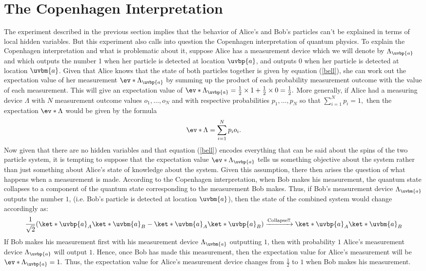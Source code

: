 \section{The Copenhagen Interpretation}
       The experiment described in the previous section implies that the behavior of Alice's and Bob's particles can't be explained in terms of local hidden variables. But this experiment also calls into question the Copenhagen interpretation of quantum physics. To explain the Copenhagen interpretation and what is problematic about it, suppose Alice has a measurement device which we will denote by $\Lambda_{\uvbp{a}}$\label{Lambdaa} and which outputs the number 1 when her particle is detected at location $\uvbp{a}$, and outputs 0 when her particle is detected at location $\uvbm{a}$. Given that Alice knows that the state of both particles together is given by equation (\ref{bell}), she can work out the expectation value of her measurement $\ev*{\Lambda_{\uvbp{a}}}$ by summing up the product of each probability measurement outcome with the value of each measurement. This will give an expectation value of $\ev*{\Lambda_{\uvbp{a}}}=\frac{1}{2}\times 1 + \frac{1}{2}\times 0 = \frac{1}{2}.$ More generally, if Alice had a measuring device $\Lambda$ with $N$ measurement outcome values $o_1,\ldots,o_N$ and with respective probabilities $p_1,\ldots,p_N$ so that $\sum_{i=1}^N p_i=1,$ then the expectation $\ev*{\Lambda}$ would be given by the formula
      \begin{equation}\label{expectation}\ev*{\Lambda} =\sum_{i=1}^N p_io_i.
      \end{equation}
      Now given that there are no hidden variables and that equation (\ref{bell}) encodes everything that can be said about the spins of the two particle system, it is tempting to suppose that the expectation value $\ev*{\Lambda_{\uvbp{a}}}$ tells us something objective about the system rather than just something about Alice's state of knowledge about the system.  Given this assumption, there then arises the question of what happens when a measurement is made. According to the Copenhagen interpretation, when Bob makes his measurement, the quantum state collapses to a component of the quantum state corresponding to the measurement Bob makes. Thus, if Bob's measurement device $\Lambda_{\uvbm{a}}$ outputs the number $1$, (i.e. Bob's particle is detected at location $\uvbm{a}$), then the state of the combined system would change accordingly as:
      $$\frac{1}{\sqrt{2}}(\ket*{\uvbp{a}}_A\ket*{\uvbm{a}}_B-\ket*{\uvbm{a}}_A\ket*{\uvbp{a}}_B)\xrightarrow{\text{Collapse!!}}\ket*{\uvbp{a}}_A\ket*{\uvbm{a}}_B $$
      If Bob makes his measurement first with his measurement device $\Lambda_{\uvbm{a}}$  outputting $1$, then with probability $1$ Alice's measurement device $\Lambda_{\uvbp{a}}$ will output $1$. Hence, once Bob has made this measurement, then the expectation value for Alice's measurement will be $\ev*{\Lambda_{\uvbp{a}}}=1.$ Thus, the expectation value for Alice's measurement device changes from $\frac{1}{2}$ to $1$ when Bob makes his measurement.
       
